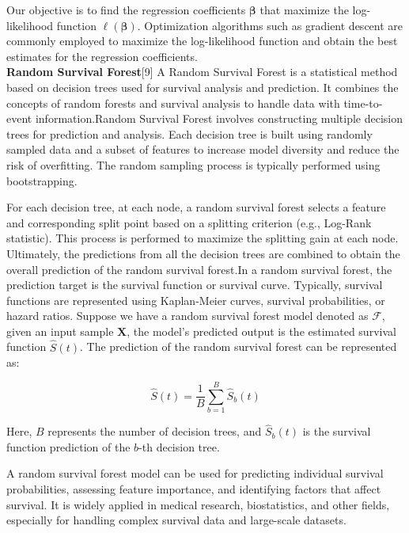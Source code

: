 \documentclass[conference]{IEEEconf}
\begin{document}
Our objective is to find the regression coefficients $\boldsymbol{\beta}$ that maximize the log-likelihood function $\ell(\boldsymbol{\beta})$. Optimization algorithms such as gradient descent are commonly employed to maximize the log-likelihood function and obtain the best estimates for the regression coefficients.\\

\textbf{Random Survival Forest}[9] A Random Survival Forest is a statistical method based on decision trees used for survival analysis and prediction. It combines the concepts of random forests and survival analysis to handle data with time-to-event information.Random Survival Forest involves constructing multiple decision trees for prediction and analysis. Each decision tree is built using randomly sampled data and a subset of features to increase model diversity and reduce the risk of overfitting. The random sampling process is typically performed using bootstrapping.

For each decision tree, at each node, a random survival forest selects a feature and corresponding split point based on a splitting criterion (e.g., Log-Rank statistic). This process is performed to maximize the splitting gain at each node. Ultimately, the predictions from all the decision trees are combined to obtain the overall prediction of the random survival forest.In a random survival forest, the prediction target is the survival function or survival curve. Typically, survival functions are represented using Kaplan-Meier curves, survival probabilities, or hazard ratios. Suppose we have a random survival forest model denoted as $\mathcal{F}$, given an input sample $\mathbf{X}$, the model's predicted output is the estimated survival function $\hat{S}(t)$. The prediction of the random survival forest can be represented as:

\begin{equation}
	\hat{S}(t) = \frac{1}{B} \sum_{b=1}^B \hat{S}_b(t)
\end{equation}

Here, $B$ represents the number of decision trees, and $\hat{S}_b(t)$ is the survival function prediction of the $b$-th decision tree.

A random survival forest model can be used for predicting individual survival probabilities, assessing feature importance, and identifying factors that affect survival. It is widely applied in medical research, biostatistics, and other fields, especially for handling complex survival data and large-scale datasets.
\end{document}
